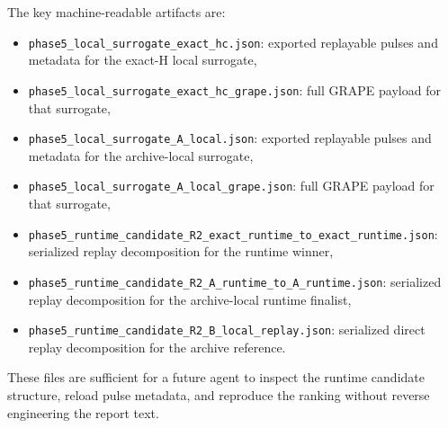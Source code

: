 \documentclass[aps,pra,twocolumn,reprint,amsmath,amssymb]{revtex4-2}
\begin{document}
The key machine-readable artifacts are:
\begin{itemize}
  \item \texttt{phase5\_local\_surrogate\_exact\_hc.json}: exported replayable pulses and metadata for the exact-H local surrogate,
  \item \texttt{phase5\_local\_surrogate\_exact\_hc\_grape.json}: full GRAPE payload for that surrogate,
  \item \texttt{phase5\_local\_surrogate\_A\_local.json}: exported replayable pulses and metadata for the archive-local surrogate,
  \item \texttt{phase5\_local\_surrogate\_A\_local\_grape.json}: full GRAPE payload for that surrogate,
  \item \texttt{phase5\_runtime\_candidate\_R2\_exact\_runtime\_to\_exact\_runtime.json}: serialized replay decomposition for the runtime winner,
  \item \texttt{phase5\_runtime\_candidate\_R2\_A\_runtime\_to\_A\_runtime.json}: serialized replay decomposition for the archive-local runtime finalist,
  \item \texttt{phase5\_runtime\_candidate\_R2\_B\_local\_replay.json}: serialized direct replay decomposition for the archive reference.
\end{itemize}

These files are sufficient for a future agent to inspect the runtime candidate
structure, reload pulse metadata, and reproduce the ranking without reverse
engineering the report text.
\end{document}
